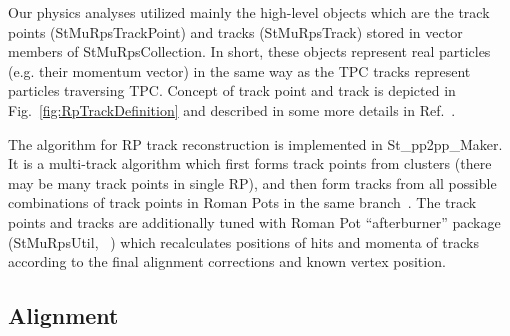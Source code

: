 Our physics analyses utilized mainly the high-level objects which are the track points (StMuRpsTrackPoint) and tracks (StMuRpsTrack) stored in vector members of StMuRpsCollection. In short, these objects represent real particles (e.g. their momentum vector) in the same way as the TPC tracks represent particles traversing TPC. Concept of track point and track is depicted in Fig.~\ref{fig:RpTrackDefinition} and  described in some more details in Ref.~\cite{RpInStEvent}.

The algorithm for RP track reconstruction is implemented in St\_pp2pp\_Maker. It is a multi-track algorithm which first forms track points from clusters (there may be many track points in single RP), and then form tracks from all possible combinations of track points in Roman Pots in the same branch~\cite{RpRecoAlgo,RpInStEvent}. The track points and tracks are additionally tuned with Roman Pot ``afterburner'' package (StMuRpsUtil, ~\cite{RpAfterburner}) which recalculates positions of hits and momenta of tracks according to the final alignment corrections and known vertex position.

\subsection{Alignment}

